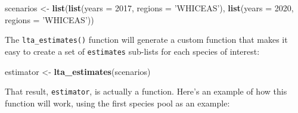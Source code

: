 \documentclass[
]{book}
\newenvironment{Shaded}{\begin{snugshade}}{\end{snugshade}}
\newcommand{\DataTypeTok}[1]{\textcolor[rgb]{0.13,0.29,0.53}{#1}}
\newcommand{\DecValTok}[1]{\textcolor[rgb]{0.00,0.00,0.81}{#1}}
\newcommand{\KeywordTok}[1]{\textcolor[rgb]{0.13,0.29,0.53}{\textbf{#1}}}
\newcommand{\NormalTok}[1]{#1}
\newcommand{\StringTok}[1]{\textcolor[rgb]{0.31,0.60,0.02}{#1}}
\begin{document}
\begin{Shaded}
\begin{Highlighting}[]
\NormalTok{scenarios <-}\StringTok{ }\KeywordTok{list}\NormalTok{(}\KeywordTok{list}\NormalTok{(}\DataTypeTok{years =} \DecValTok{2017}\NormalTok{,}
                       \DataTypeTok{regions =} \StringTok{'WHICEAS'}\NormalTok{),}
                  \KeywordTok{list}\NormalTok{(}\DataTypeTok{years =} \DecValTok{2020}\NormalTok{, }
                       \DataTypeTok{regions =} \StringTok{'WHICEAS'}\NormalTok{))}
\end{Highlighting}
\end{Shaded}

The \texttt{lta\_estimates()} function will generate a custom function that makes it easy to create a set of \texttt{estimates} sub-lists for each species of interest:

\begin{Shaded}
\begin{Highlighting}[]
\NormalTok{estimator <-}\StringTok{ }\KeywordTok{lta_estimates}\NormalTok{(scenarios)}
\end{Highlighting}
\end{Shaded}

That result, \texttt{estimator}, is actually a function. Here's an example of how this function will work, using the first species pool as an example:
\end{document}
